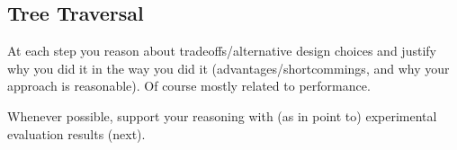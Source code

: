 \subsection{Tree Traversal}
\label{sec:traversal}
At each step you reason about tradeoffs/alternative design choices and
justify why you did it in the way you did it (advantages/shortcommings,
and why your approach is reasonable). Of course mostly related to performance.

Whenever possible, support your reasoning with (as in point to) experimental
evaluation results (next).
